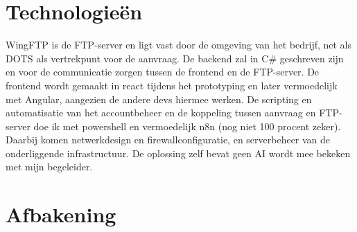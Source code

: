 
\section{Technologieën}%
\label{vst:technologieen}

%
%

WingFTP is de FTP-server en ligt vast door de omgeving van het bedrijf, net als DOTS als vertrekpunt voor de aanvraag. De backend zal in C\# geschreven zijn en voor de communicatie zorgen tussen de frontend en de FTP-server. De frontend wordt gemaakt in react tijdens het prototyping en later vermoedelijk met Angular, aangezien de andere devs hiermee werken. De scripting en automatisatie van het accountbeheer en de koppeling tussen aanvraag en FTP-server doe ik met powershell en vermoedelijk n8n (nog niet 100 procent zeker). Daarbij komen netwerkdesign en firewallconfiguratie, en serverbeheer van de onderliggende infrastructuur. De oplossing zelf bevat geen AI wordt mee bekeken met mijn begeleider.


\section{Afbakening}%
\label{vst:afbakening}

%
%

